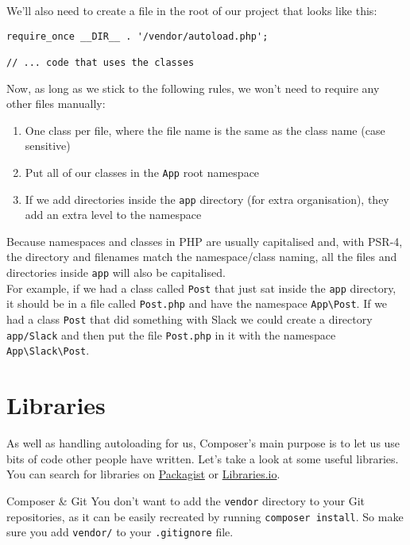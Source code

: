 We'll also need to create a file in the root of our project that looks like this:

\begin{verbatim}
require_once __DIR__ . '/vendor/autoload.php';

// ... code that uses the classes
\end{verbatim}

Now, as long as we stick to the following rules, we won't need to require any other files manually:

\begin{enumerate}
    \item One class per file, where the file name is the same as the class name (case sensitive)
    \item Put all of our classes in the \texttt{App} root namespace
    \item If we add directories inside the \texttt{app} directory (for extra organisation), they add an extra level to the namespace
\end{enumerate}

Because namespaces and classes in PHP are usually capitalised and, with PSR-4, the directory and filenames match the namespace/class naming, all the files and directories inside \texttt{app} will also be capitalised.
\\

For example, if we had a class called \texttt{Post} that just sat inside the \texttt{app} directory, it should be in a file called \texttt{Post.php} and have the namespace \texttt{App\textbackslash Post}. If we had a class \texttt{Post} that did something with Slack we could create a directory \texttt{app/Slack} and then put the file \texttt{Post.php} in it with the namespace \texttt{App\textbackslash Slack\textbackslash Post}.



\section{Libraries}

As well as handling autoloading for us, Composer's main purpose is to let us use bits of code other people have written. Let's take a look at some useful libraries.
\\

You can search for libraries on \href{https://packagist.org}{Packagist} or \href{https://libraries.io/search?languages=PHP}{Libraries.io}.


\begin{infobox}{Composer \& Git}
    You don't want to add the \texttt{vendor} directory to your Git repositories, as it can be easily recreated by running \texttt{composer install}. So make sure you add \texttt{vendor/} to your \texttt{.gitignore} file.
\end{infobox}


